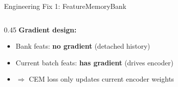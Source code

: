 \documentclass[aspectratio=169, 10pt]{beamer}
\begin{document}
\begin{frame}{Engineering Fix 1: FeatureMemoryBank}
\begin{columns}[T]
\begin{column}{0.45\textwidth}
\vspace{0.1cm}
\textbf{Gradient design:}
\begin{itemize}\small
    \item Bank feats: \textbf{no gradient} (detached history)
    \item Current batch feats: \textbf{has gradient} (drives encoder)
    \item $\Rightarrow$ CEM loss only updates current encoder weights
\end{itemize}
\end{column}
\end{columns}

\end{frame}

\end{document}
